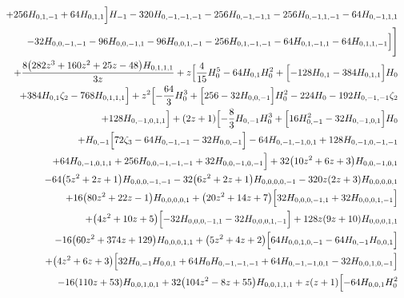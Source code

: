 \begin{eqnarray}
\nonumber \\ &&
+256 H_{0,1,-1}+64H_{0,1,1}\Bigr] H_{-1}-320 H_{0,-1,-1,-1}
-256 H_{0,-1,-1,1}-256 H_{0,-1,1,-1}-64 H_{0,-1,1,1}
\nonumber \\ &&
-32 H_{0,0,-1,-1}
-96H_{0,0,-1,1}-96 H_{0,0,1,-1}
-256H_{0,1,-1,-1}
-64 H_{0,1,-1,1}-64H_{0,1,1,-1}\Bigr]\Biggr]
\nonumber \\ &&
+\frac{8 \big(282 z^3+160 z^2+25 z-48\big)  H_{0,1,1,1}}{3 z}
+z \Bigl[\frac{4}{15} H_0^5-64  H_{0,1}H_0^2
+\Bigl[-128  H_{0,1}
-384  H_{0,1,1}\Bigr] H_0
\nonumber \\ &&
+384 H_{0,1} \zeta_2
-768  H_{0,1,1,1}\Bigr]
+z^2 \Bigl[-\frac{64}{3} H_0^3+\Bigl[256 -32 H_{0,0,-1}\Bigr] H_0^2-224  H_0
-192 H_{0,-1,-1}\zeta_2
\nonumber \\ &&
+128  H_{0,-1,0,1,1}\Bigr]
+(2 z+1) \Bigl[-\frac{8}{3} H_{0,-1}H_0^3
+\Bigl[16 H_{0,-1}^2-32  H_{0,-1,0,1}\Bigr] H_0
\nonumber \\ &&
+H_{0,-1} \Bigl[72 \zeta_3-64 H_{0,-1,-1}-32 H_{0,0,-1}\Bigr]-64 H_{0,-1,-1,0,1}
+128H_{0,-1,0,-1,-1}
\nonumber \\ &&
+64 H_{0,-1,0,1,1}+256 H_{0,0,-1,-1,-1}+32H_{0,0,-1,0,-1}\Bigr]+32 \big(10 z^2+6 z+3\big) H_{0,0,-1,0,1}
\nonumber \\ &&
-64 \big(5 z^2+2z+1\big) H_{0,0,0,-1,-1}-32 \big(6 z^2+2 z+1\big) H_{0,0,0,0,-1}-320  z(2 z+3) H_{0,0,0,0,1}
\nonumber \\ &&
+16 \big(80 z^2+22 z-1\big) H_{0,0,0,0,1}+\big(20 z^2+14z+7\big) \Bigl[32 H_{0,0,0,-1,1}+32 H_{0,0,0,1,-1}\Bigr]
\nonumber \\ &&
+\big(4 z^2+10 z+5\big)\Bigl[-32  H_{0,0,0,-1,1}-32  H_{0,0,0,1,-1}\Bigr]+128  z (9z+10) H_{0,0,0,1,1}
\nonumber \\ &&
-16 \big(60 z^2+374 z+129\big) H_{0,0,0,1,1}+\big(5 z^2+4z+2\big) \Bigl[64 H_{0,0,1,0,-1}-64 H_{0,-1} H_{0,0,1}\Bigr]
\nonumber \\ &&
+\big(4 z^2+6z+3\big) \Bigl[32  H_{0,-1} H_{0,0,1}+64 H_0 H_{0,-1,-1,-1}+64 H_{0,-1,-1,0,1}-32  H_{0,0,1,0,-1}\Bigr]
\nonumber \\ &&
-16 (110 z+53) H_{0,0,1,0,1}+32\big(104 z^2-8 z+55\big) H_{0,0,1,1,1}+z (z+1) \Bigl[-64  H_{0,0,1}H_0^2
\nonumber \\ &&

\end{eqnarray}
